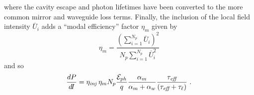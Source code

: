 {\begin{equation}
\end{equation}
where the cavity escape and photon lifetimes have been converted to the more common mirror and waveguide loss terms.  Finally, the inclusion of the local field intensity $\bar{U}_i$ adds a ``modal efficiency'' factor $\eta_m$ given by \cite{Gresch:PTL:2006}
\begin{equation}
\eta_m = \frac{\left(\sum_{i=1}^{N_p} \bar{U}_i\right)^2}{N_p \sum_{i=1}^{N_p} \bar{U}_i^2}
\end{equation}
and so
\begin{equation}
\frac{d P}{d\!I} = \eta_\textit{inj} \: \eta_m N_p \frac{\EE_{ph}}{q} \frac{\alpha_m}{\alpha_m+\alpha_w}  \frac{\tau_\textit{eff}}{\left(\tau_\textit{eff}+\tau_{\ell}\right)} \tn{~.}
\end{equation}





}
